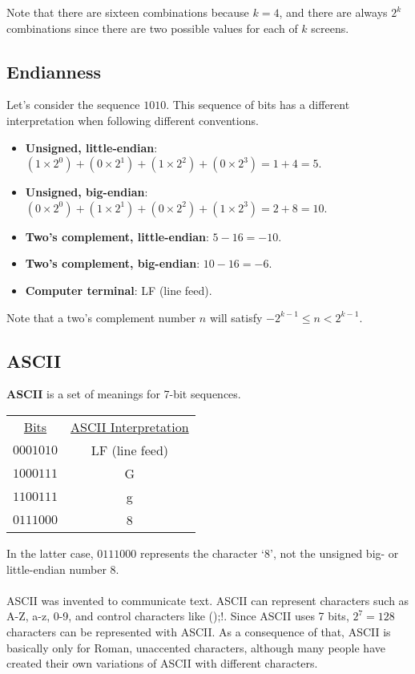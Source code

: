 \documentclass[]{article}
\theoremstyle{definition}
\begin{document}
		Note that there are sixteen combinations because $k = 4$, and there are always $2^k$ combinations since there are two possible values for each of $k$ screens.
	
		\subsection{Endianness}
			Let's consider the sequence $1010$. This sequence of bits has a different interpretation when following different conventions.
			\begin{itemize}
				\item \textbf{Unsigned, little-endian}: $(1 \times 2^0) + (0 \times 2^1) + (1 \times 2^2) + (0 \times 2^3) = 1 + 4 = 5$.
				\item \textbf{Unsigned, big-endian}: $(0 \times 2^0) + (1 \times 2^1) + (0 \times 2^2) + (1 \times 2^3) = 2 + 8 = 10$.
				\item \textbf{Two's complement, little-endian}: $5 - 16 = -10$.
				\item \textbf{Two's complement, big-endian}: $10 - 16 = -6$.
				\item \textbf{Computer terminal}: LF (line feed).
			\end{itemize}
	
			Note that a two's complement number $n$ will satisfy $-2^{k-1} \le n < 2^{k-1}$.
	
		\subsection{ASCII}
	
			\textbf{ASCII} is a set of meanings for 7-bit sequences.
		
			\begin{center}
				\begin{tabular}{cc}
					\underline{Bits} & \underline{ASCII Interpretation} \\
					$0001010$ & LF (line feed) \\
					$1000111$ & G \\
					$1100111$ & g \\
					$0111000$ & 8
				\end{tabular}
			\end{center}
			
			In the latter case, $0111000$ represents the character `$8$', not the unsigned big- or little-endian number $8$. \\ \\
			ASCII was invented to communicate text. ASCII can represent characters such as A-Z, a-z, 0-9, and control characters like ();!. Since ASCII uses 7 bits, $2^7 = 128$ characters can be represented with ASCII. As a consequence of that, ASCII is basically only for Roman, unaccented characters, although many people have created their own variations of ASCII with different characters.
	
\end{document}
